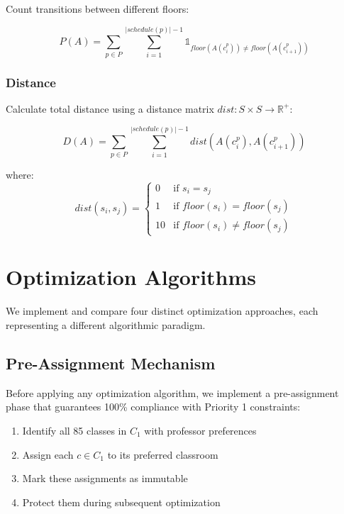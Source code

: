 \documentclass[algorithms,article,submit,pdftex,moreauthors]{Definitions/mdpi}
\begin{document}
Count transitions between different floors:

\begin{equation}
P(A) = \sum_{p \in P} \sum_{i=1}^{|schedule(p)|-1} \mathbb{1}_{floor(A(c_i^p)) \neq floor(A(c_{i+1}^p))}
\end{equation}

\subsubsection{Distance}

Calculate total distance using a distance matrix $dist: S \times S \rightarrow \mathbb{R}^+$:

\begin{equation}
D(A) = \sum_{p \in P} \sum_{i=1}^{|schedule(p)|-1} dist(A(c_i^p), A(c_{i+1}^p))
\end{equation}

where:
\begin{equation}
dist(s_i, s_j) = \begin{cases}
0 & \text{if } s_i = s_j \\
1 & \text{if } floor(s_i) = floor(s_j) \\
10 & \text{if } floor(s_i) \neq floor(s_j)
\end{cases}
\end{equation}

\section{Optimization Algorithms}

We implement and compare four distinct optimization approaches, each representing a different algorithmic paradigm.

\subsection{Pre-Assignment Mechanism}
\label{sec:preassignment}

Before applying any optimization algorithm, we implement a pre-assignment phase that guarantees 100\% compliance with Priority 1 constraints:

\begin{enumerate}
\item Identify all 85 classes in $C_1$ with professor preferences
\item Assign each $c \in C_1$ to its preferred classroom
\item Mark these assignments as immutable
\item Protect them during subsequent optimization
\end{enumerate}
\end{document}
